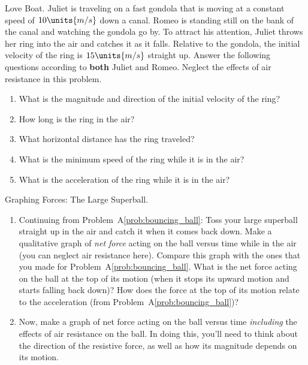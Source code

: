 \begin{aproblem}{Love Boat.} 
  Juliet is traveling on a fast gondola that is moving at a constant
  speed of $10\units{m/s}$ down a canal.  Romeo is standing still on
  the bank of the canal and watching the gondola go by.  To attract
  his attention, Juliet throws her ring into the air and catches it as
  it falls.  Relative to the gondola, the initial velocity of the ring
  is $15\units{m/s}$ straight up.  Answer the following questions
  according to {\bf both} Juliet and Romeo.  Neglect the effects of
  air resistance in this problem.
  \begin{enumerate}
  \item What is the magnitude and direction of the initial velocity of
    the ring?
  \item How long is the ring in the air?
  \item What horizontal distance has the ring traveled?
  \item What is the minimum speed of the ring while it is in the air?
  \item What is the acceleration of the ring while it is in the air?
  \end{enumerate}
\end{aproblem}

\begin{aproblem}{Graphing Forces: The Large Superball.}
  \begin{enumerate}
  \item Continuing from Problem~A\ref{prob:bouncing_ball}: Toss your
    large superball straight up in the air and catch it when it comes
    back down.  Make a qualitative graph of {\em net force} acting on
    the ball versus time while in the air (you can neglect air
    resistance here).  Compare this graph with the ones that you made
    for Problem~A\ref{prob:bouncing_ball}.  What is the net force
    acting on the ball at the top of its motion (when it stops its
    upward motion and starts falling back down)?  How does the force
    at the top of its motion relate to the acceleration (from
    Problem~A\ref{prob:bouncing_ball})?

  \item Now, make a graph of net force acting on the ball versus time
    {\em including} the effects of air resistance on the ball.  In
    doing this, you'll need to think about the direction of the
    resistive force, as well as how its magnitude depends on its
    motion.
  \end{enumerate}
\end{aproblem}

